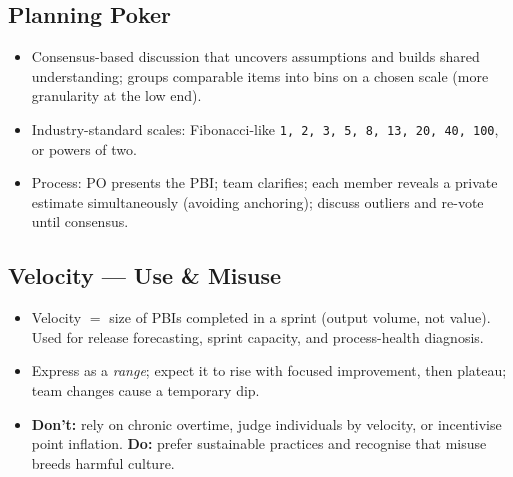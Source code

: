 \documentclass[hidelinks]{article}
\begin{document}

\subsection{Planning Poker}
\begin{itemize}
  \item Consensus-based discussion that uncovers assumptions and builds shared understanding;
        groups comparable items into bins on a chosen scale (more granularity at the low end).
  \item Industry-standard scales: Fibonacci-like \texttt{1, 2, 3, 5, 8, 13, 20, 40, 100}, or
        powers of two.
  \item Process: PO presents the PBI; team clarifies; each member reveals a private estimate
        simultaneously (avoiding anchoring); discuss outliers and re-vote until consensus.
\end{itemize}

\subsection{Velocity --- Use \& Misuse}
\begin{itemize}
  \item Velocity $=$ size of PBIs completed in a sprint (output volume, not value). Used for release
        forecasting, sprint capacity, and process-health diagnosis.
  \item Express as a \emph{range}; expect it to rise with focused improvement, then plateau; team
        changes cause a temporary dip.
  \item \textbf{Don't:} rely on chronic overtime, judge individuals by velocity, or incentivise
        point inflation. \textbf{Do:} prefer sustainable practices and recognise that misuse breeds
        harmful culture.
\end{itemize}
\end{document}
